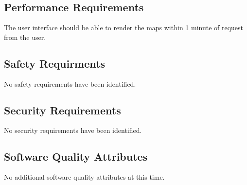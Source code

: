 \documentclass[12pt, letterpaper]{article}
\begin{document}
  \subsection{Performance Requirements}
  The user interface should be able to render the maps within 1 minute of request from the user.

  \subsection{Safety Requirments}
  No safety requirements have been identified.
  \subsection{Security Requirements}
  No security requirements have been identified.
  \subsection{Software Quality Attributes}
	No additional software quality attributes at this time.

%
%
%
% 
\end{document}
